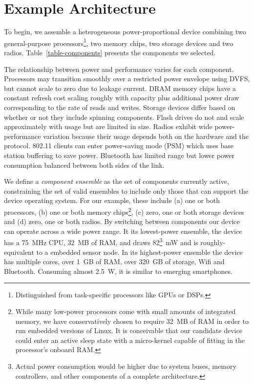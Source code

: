 \vspace*{-0.1in}
\section{Example Architecture}
\label{section-architecture}



To begin, we assemble a heterogeneous power-proportional device combining two
general-purpose processors\footnote{Distinguished from task-specific
processors like GPUs or DSPs.}, two memory chips, two storage devices and two
radios. Table~\ref{table-components} presents the components we selected.

The relationship between power and performance varies for each component.
Processors may transition smoothly over a restricted power envelope using
DVFS, but cannot scale to zero due to leakage current. DRAM memory chips have
a constant refresh cost scaling roughly with capacity plus additional power
draw corresponding to the rate of reads and writes. Storage devices differ
based on whether or not they include spinning components. Flash drives do not
and scale approximately with usage but are limited in size. Radios exhibit
wide power-performance variation because their usage depends both on the
hardware and the protocol. 802.11 clients can enter power-saving mode (PSM)
which uses base station buffering to save power. Bluetooth has limited range
but lower power consumption balanced between both sides of the link.

We define a \textit{component ensemble} as the set of components currently
active, constraining the set of valid ensembles to include only those that
can support the device operating system. For our example, these include (a)
one or both processors, (b) one or both memory chips\footnote{While many
low-power processors come with small amounts of integrated memory, we have
conservatively chosen to require 32~MB of RAM in order to run embedded
versions of Linux. It is conceivable that our candidate device could enter an
active sleep state with a micro-kernel capable of fitting in the processor's
onboard RAM.}, (c) zero, one or both storage devices and (d) zero, one or
both radios. By switching between components our device can operate across a
wide power range. It its lowest-power ensemble, the device has a 75~MHz CPU,
32~MB of RAM, and draws 82\footnote{Actual power consumption would be higher
due to system buses, memory controllers, and other components of a complete
architecture.}~mW and is roughly-equivalent to a embedded sensor node. In its
highest-power ensemble the device has multiple cores, over 1~GB of RAM, over
320~GB of storage, Wifi and Bluetooth. Consuming almost 2.5~W, it is similar
to emerging smartphones.

